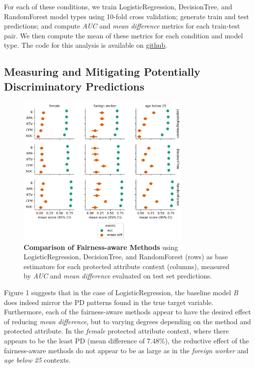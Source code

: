 \documentclass{{interact/interact}}
\begin{document}
For each of these conditions, we train LogisticRegression, DecisionTree, and
RandomForest model types using 10-fold cross validation; generate train and test
predictions; and compute \emph{AUC} and \emph{mean difference} metrics for each
train-test pair. We then compute the mean of these metrics for each condition and
model type. The code for this analysis is available on
\href{https://github.com/cosmicBboy/themis-ml/blob/master/paper/Evaluating%20Themis-ml.ipynb}{\underline{github}}.

\subsection{Measuring and Mitigating Potentially Discriminatory Predictions}

\begin{figure}[h]
\centering
\includegraphics[width=8.5cm]{IMG/fairness_aware_comparison.png}
\caption{
  \textbf{Comparison of Fairness-aware Methods} using LogisticRegression,
  DecisionTree, and RandomForest (rows) as base estimators for each protected
  attribute context (columns), measured by \emph{AUC} and
  \emph{mean difference} evaluated on test set predictions.}
\label{figure-1-comparison-fa-methods}
\end{figure}

Figure 1 suggests that in the case of LogisticRegression, the baseline model
\emph{B} does indeed mirror the PD patterns found in the true target variable.
Furthermore, each of the fairness-aware methods appear to have the desired
effect of reducing \emph{mean difference}, but to varying degrees depending on
the method and protected attribute. In the \emph{female} protected attribute
context, where there appears to be the least PD (mean difference of \(7.48\%\)),
the reductive effect of the fairness-aware methods do not appear to be as
large as in the \emph{foreign worker} and \emph{age below 25} contexts.
\end{document}

